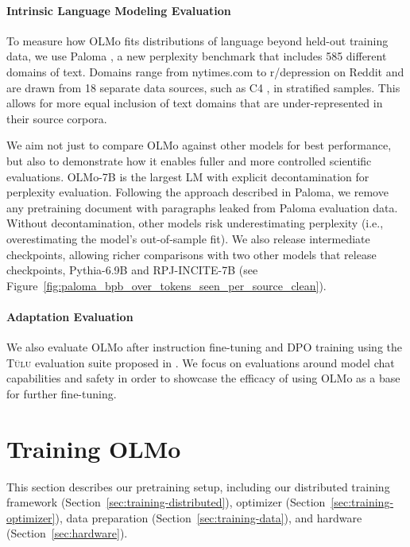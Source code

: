 \documentclass[11pt]{article}
\newcommand{\olmo}{OLMo\xspace}
\newcommand{\model}{OLMo-7B\xspace}
\newcommand{\tulu}{\textsc{T\"ulu}\xspace}
\begin{document}
\paragraph{Intrinsic Language Modeling Evaluation}

To measure how OLMo fits distributions of language beyond held-out training data, we use Paloma \citep{magnusson2023paloma}, a new perplexity benchmark that includes 585 different domains of text. Domains range from nytimes.com to r/depression on Reddit and are drawn from 18 separate data sources, such as C4 \citep{raffel2020exploring}, in stratified samples. This allows for more equal inclusion of text domains that are under-represented in their source corpora. 

We aim not just to compare \olmo against other models for best performance, but also to demonstrate how it enables fuller and more controlled scientific evaluations. \model is the largest LM with explicit decontamination for perplexity evaluation. Following the approach described in Paloma, we remove any pretraining document with paragraphs leaked from Paloma evaluation data. Without decontamination, other models risk underestimating perplexity (i.e., overestimating the model's out-of-sample fit).  We also release intermediate checkpoints, allowing richer comparisons with two other models that release checkpoints, Pythia-6.9B \citep{pmlr-v202-biderman23a} and RPJ-INCITE-7B \citep{together2023redpajama} (see Figure~\ref{fig:paloma_bpb_over_tokens_seen_per_source_clean}). 

\paragraph{Adaptation Evaluation} We also evaluate \olmo after instruction fine-tuning and DPO training using the \tulu evaluation suite proposed in \citet{wang2023far, ivison2023camels}.
We focus on evaluations around model chat capabilities and safety in order to showcase the efficacy of using \olmo as a base for further fine-tuning.

\section{Training \olmo}

This section describes our pretraining setup, including our distributed training framework (Section~\ref{sec:training-distributed}), optimizer  (Section~\ref{sec:training-optimizer}), data preparation (Section~\ref{sec:training-data}), and hardware (Section~\ref{sec:hardware}).
\end{document}
